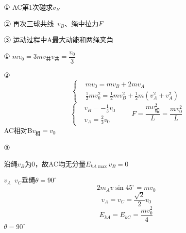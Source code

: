 \begin{problem}

① AC第1次碰\quad 求$v_B$

② 再次三球共线\ $v_B$、绳中拉力$F$

③ 运动过程中A最大动能和两绳夹角
\begin{solution}
① $mv_0=3mv_{\text{共}}$\quad $v_{\text{共}}=\dfrac{v_0}{3}$

② \[
\left\{\begin{aligned}
&mv_0=mv_B+2mv_A\\
&\frac{1}{2}mv_0^2=\frac{1}{2}mv_B^2+\frac{1}{2}m\left(v_A^2+v_A^2\right)
\end{aligned}\right.
\]
\[
\left\{\begin{aligned}
&v_B=-\frac{1}{3}v_0\\
&v_A=\frac{2}{3}v_0
\end{aligned}\right.
\qquad
F=\frac{m v_{\text{相}}^2}{L}=\frac{mv_0^2}{L}
\]
AC相对B\quad $v_{\text{相}}=v_0$

③

沿绳$v_B$为0，故AC均无分量\quad $E_{kA\max}$\quad $v_B=0$

$v_A$\ $v_C$垂绳\quad $\theta=90^\circ$
\[ 2m_Av\sin 45^\circ=mv_0 \]%
\[ v_A=v_C=\frac{\sqrt{2}}{2}v_0 \]
\[ E_{kA}=E_{kC}=\frac{mv_0^2}{4} \]
$\theta=90^\circ$ %
\end{solution}
\end{problem}
